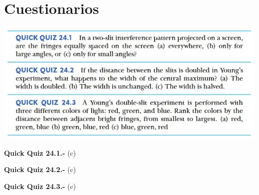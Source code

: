 \documentclass[a4paper,12pt]{article}
\newenvironment{Figure}
  {\par\medskip\noindent\minipage{\linewidth}}
  {\endminipage\par\medskip}
\begin{document}





\section*{Cuestionarios}

    \begin{Figure}
        \centering
        \includegraphics[width=0.8\linewidth]{quiz.jpg}
        \label{fig: cuestionarios}
    \end{Figure}

    \textbf{Quick Quiz 24.1.-} (c) 

    \textbf{Quick Quiz 24.2.-} (c)
    
    \textbf{Quick Quiz 24.3.-} (c)




\end{document}
